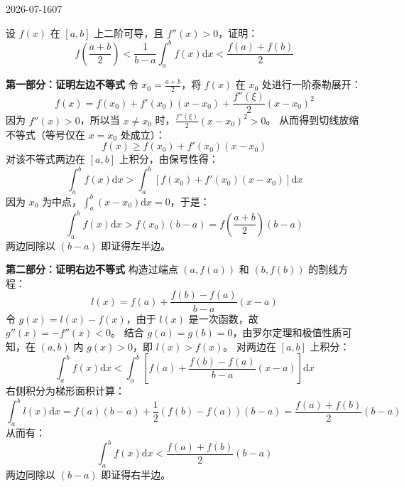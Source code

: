 \begin{mistake}{2026-07-16}{07}

\begin{problemcontent}
设 \(f(x)\) 在 \([a,b]\) 上二阶可导，且 \(f''(x) > 0\)，证明：
\[ f\left(\frac{a+b}{2}\right) < \frac{1}{b-a}\int_a^b f(x)\mathrm{d}x < \frac{f(a)+f(b)}{2} \]
\end{problemcontent}

\begin{solutioncontent}
\textbf{第一部分：证明左边不等式}
令 \(x_0 = \frac{a+b}{2}\)，将 \(f(x)\) 在 \(x_0\) 处进行一阶泰勒展开：
\[ f(x) = f(x_0) + f'(x_0)(x-x_0) + \frac{f''(\xi)}{2}(x-x_0)^2 \]
因为 \(f''(x) > 0\)，所以当 \(x \neq x_0\) 时，\(\frac{f''(\xi)}{2}(x-x_0)^2 > 0\)。
从而得到切线放缩不等式（等号仅在 \(x = x_0\) 处成立）：
\[ f(x) \ge f(x_0) + f'(x_0)(x-x_0) \]
对该不等式两边在 \([a,b]\) 上积分，由保号性得：
\[ \int_a^b f(x)\mathrm{d}x > \int_a^b \left[ f(x_0) + f'(x_0)(x-x_0) \right]\mathrm{d}x \]
因为 \(x_0\) 为中点，\(\int_a^b (x-x_0)\mathrm{d}x = 0\)，于是：
\[ \int_a^b f(x)\mathrm{d}x > f(x_0)(b-a) = f\left(\frac{a+b}{2}\right)(b-a) \]
两边同除以 \((b-a)\) 即证得左半边。

\textbf{第二部分：证明右边不等式}
构造过端点 \((a, f(a))\) 和 \((b, f(b))\) 的割线方程：
\[ l(x) = f(a) + \frac{f(b)-f(a)}{b-a}(x-a) \]
令 \(g(x) = l(x) - f(x)\)，由于 \(l(x)\) 是一次函数，故 \(g''(x) = -f''(x) < 0\)。
结合 \(g(a) = g(b) = 0\)，由罗尔定理和极值性质可知，在 \((a,b)\) 内 \(g(x) > 0\)，即 \(l(x) > f(x)\)。
对两边在 \([a,b]\) 上积分：
\[ \int_a^b f(x)\mathrm{d}x < \int_a^b \left[ f(a) + \frac{f(b)-f(a)}{b-a}(x-a) \right]\mathrm{d}x \]
右侧积分为梯形面积计算：
\[ \int_a^b l(x)\mathrm{d}x = f(a)(b-a) + \frac{1}{2}(f(b)-f(a))(b-a) = \frac{f(a)+f(b)}{2}(b-a) \]
从而有：
\[ \int_a^b f(x)\mathrm{d}x < \frac{f(a)+f(b)}{2}(b-a) \]
两边同除以 \((b-a)\) 即证得右半边。
\end{solutioncontent}


\end{mistake}

